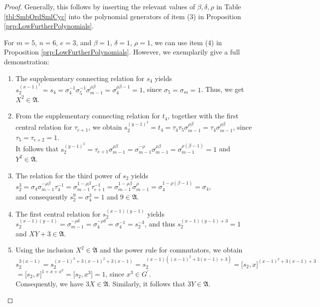 \documentclass{amsart}
\theoremstyle{definition}
\numberwithin{equation}{section}
\begin{document}
\begin{proof}
Generally, this follows by inserting the relevant values of \(\beta,\delta,\rho\) in Table
\ref{tbl:SmbOrdSmlCyc}
into the polynomial generators of item (3) in Proposition
\ref{prp:LowFurtherPolynomials}.

For \(m=5\), \(n=6\), \(e=3\), and \(\beta=1\), \(\delta=1\), \(\rho=1\),
we can use item (4) in Proposition
\ref{prp:LowFurtherPolynomials}.
However, we exemplarily give a full demonstration:

\begin{enumerate}

\item
The supplementary connecting relation for \(s_4\) yields\\
\(s_2^{(x-1)^2}=s_4=\sigma_4^{-1}\sigma_5^{-1}\sigma_{m-1}^{\rho\beta}=\sigma_4^{\rho\beta-1}=1\),
since \(\sigma_5=\sigma_m=1\). Thus, we get \(X^2\in\mathfrak{A}\).

\item
From the supplementary connecting relation for \(t_4\),
together with the first central relation for \(\tau_{e+1}\), we obtain
\(s_2^{(y-1)^2}=t_4=\tau_4\tau_5\sigma_{m-1}^{\rho\beta}
=\tau_4\sigma_{m-1}^{\rho\beta}\),
since \(\tau_5=\tau_{e+2}=1\).\\
It follows that
\(s_2^{(y-1)^2}=\tau_{e+1}\sigma_{m-1}^{\rho\beta}
=\sigma_{m-1}^{-\rho}\sigma_{m-1}^{\rho\beta}=\sigma_{m-1}^{\rho(\beta-1)}=1\) and
\(Y^2\in\mathfrak{A}\).

\item
The relation for the third power of \(s_2\) yields\\
\(s_2^3=\sigma_4\sigma_{m-1}^{-\rho\beta}\tau_4^{-1}
=\sigma_{m-1}^{1-\rho\beta}\tau_{e+1}^{-1}=\sigma_{m-1}^{1-\rho\beta}\sigma_{m-1}^{\rho}
=\sigma_4^{1-\rho(\beta-1)}=\sigma_4\),\\
and consequently
\(s_2^9=\sigma_4^3=1\) and \(9\in\mathfrak{A}\).

\item
The first central relation for \(s_2^{(x-1)(y-1)}\) yields\\
\(s_2^{(x-1)(y-1)}=\sigma_{m-1}^{-\rho\delta}=\sigma_4^{-\rho\delta}=\sigma_4^{-1}
=s_2^{-3}\), and thus \(s_2^{(x-1)(y-1)+3}=1\) and \(XY+3\in\mathfrak{A}\).

\item
Using the inclusion \(X^2\in\mathfrak{A}\) and the power rule for commutators, we obtain\\
\(s_2^{3(x-1)}=s_2^{(x-1)^3+3(x-1)^2+3(x-1)}=s_2^{(x-1)((x-1)^2+3(x-1)+3)}=\lbrack s_2,x\rbrack^{(x-1)^2+3(x-1)+3}\)\\
\(=\lbrack s_2,x\rbrack^{1+x+x^2}=\lbrack s_2,x^3\rbrack=1\), since \(x^3\in G^\prime\).\\
Consequently, we have \(3X\in\mathfrak{A}\).
Similarly, it follows that \(3Y\in\mathfrak{A}\).


\end{enumerate}
\end{proof}
\end{document}
